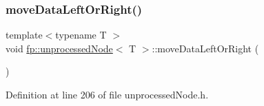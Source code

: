 \subsubsection{\texorpdfstring{move\+Data\+Left\+Or\+Right()}{moveDataLeftOrRight()}\hspace{0.1cm}{\footnotesize\ttfamily [1/2]}}
{\footnotesize\ttfamily template$<$typename T $>$ \\
void \hyperlink{classfp_1_1unprocessedNode}{fp\+::unprocessed\+Node}$<$ T $>$\+::move\+Data\+Left\+Or\+Right (\begin{DoxyParamCaption}{ }\end{DoxyParamCaption})\hspace{0.3cm}{\ttfamily [inline]}}



Definition at line 206 of file unprocessed\+Node.\+h.


